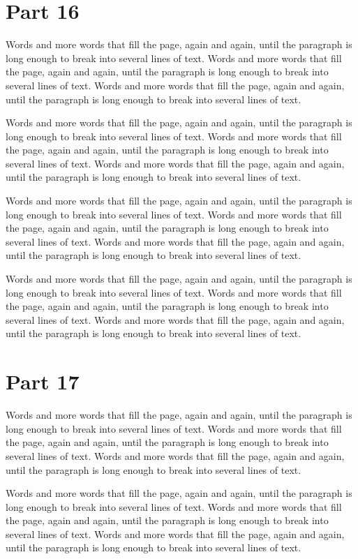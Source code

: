 \documentclass{article}
\begin{document}
\section{Part 16}
Words and more words that fill the page, again and again, until the paragraph is long enough to break into several lines of text. Words and more words that fill the page, again and again, until the paragraph is long enough to break into several lines of text. Words and more words that fill the page, again and again, until the paragraph is long enough to break into several lines of text. 

Words and more words that fill the page, again and again, until the paragraph is long enough to break into several lines of text. Words and more words that fill the page, again and again, until the paragraph is long enough to break into several lines of text. Words and more words that fill the page, again and again, until the paragraph is long enough to break into several lines of text. 

Words and more words that fill the page, again and again, until the paragraph is long enough to break into several lines of text. Words and more words that fill the page, again and again, until the paragraph is long enough to break into several lines of text. Words and more words that fill the page, again and again, until the paragraph is long enough to break into several lines of text. 

Words and more words that fill the page, again and again, until the paragraph is long enough to break into several lines of text. Words and more words that fill the page, again and again, until the paragraph is long enough to break into several lines of text. Words and more words that fill the page, again and again, until the paragraph is long enough to break into several lines of text. 

\section{Part 17}
Words and more words that fill the page, again and again, until the paragraph is long enough to break into several lines of text. Words and more words that fill the page, again and again, until the paragraph is long enough to break into several lines of text. Words and more words that fill the page, again and again, until the paragraph is long enough to break into several lines of text. 

Words and more words that fill the page, again and again, until the paragraph is long enough to break into several lines of text. Words and more words that fill the page, again and again, until the paragraph is long enough to break into several lines of text. Words and more words that fill the page, again and again, until the paragraph is long enough to break into several lines of text. 
\end{document}
